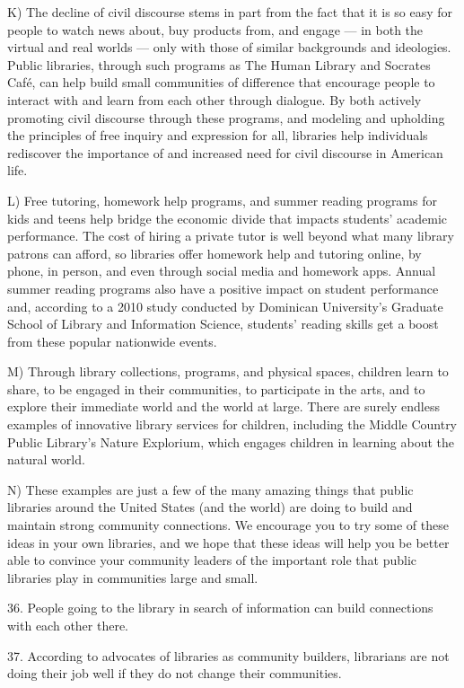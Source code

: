 \documentclass[UTF8,11pt]{ctexart}
\begin{document}
K) The decline of civil discourse stems in part from the fact that it is so easy for people to watch news about, buy products from, and engage — in both the virtual and real worlds — only with those of similar backgrounds and ideologies. Public libraries, through such programs as The Human Library and Socrates Café, can help build small communities of difference that encourage people to interact with and learn from each other through dialogue. By both actively promoting civil discourse through these programs, and modeling and upholding the principles of free inquiry and expression for all, libraries help individuals rediscover the importance of and increased need for civil discourse in American life.


L) Free tutoring, homework help programs, and summer reading programs for kids and teens help bridge the economic divide that impacts students’ academic performance. The cost of hiring a private tutor is well beyond what many library patrons can afford, so libraries offer homework help and tutoring online, by phone, in person, and even through social media and homework apps. Annual summer reading programs also have a positive impact on student performance and, according to a 2010 study conducted by Dominican University’s Graduate School of Library and Information Science, students’ reading skills get a boost from these popular nationwide events.


M) Through library collections, programs, and physical spaces, children learn to share, to be engaged in their communities, to participate in the arts, and to explore their immediate world and the world at large. There are surely endless examples of innovative library services for children, including the Middle Country Public Library’s Nature Explorium, which engages children in learning about the natural world.


N) These examples are just a few of the many amazing things that public libraries around the United States (and the world) are doing to build and maintain strong community connections. We encourage you to try some of these ideas in your own libraries, and we hope that these ideas will help you be better able to convince your community leaders of the important role that public libraries play in communities large and small.


36. People going to the library in search of information can build connections with each other there.


37. According to advocates of libraries as community builders, librarians are not doing their job well if they do not change their communities.
\end{document}
